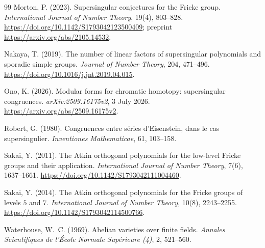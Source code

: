 \documentclass[11pt,a4paper]{article}
\numberwithin{equation}{section}
\theoremstyle{definition}
\theoremstyle{remark}
\begin{document}
\begin{thebibliography}{99}
 Morton, P. (2023). Supersingular conjectures for the
Fricke group. \emph{International Journal of Number Theory}, 19(4), 803--828.
\url{https://doi.org/10.1142/S1793042123500409}; preprint
\url{https://arxiv.org/abs/2105.14532}.

 Nakaya, T. (2019). The number of linear factors of
supersingular polynomials and sporadic simple groups. \emph{Journal of Number Theory},
204, 471--496. \url{https://doi.org/10.1016/j.jnt.2019.04.015}.


 Ono, K. (2026). Modular forms for chromatic homotopy: supersingular congruences. \emph{arXiv:2509.16175v2}, 3 July 2026. \url{https://arxiv.org/abs/2509.16175v2}.


 Robert, G. (1980). Congruences entre s\'eries d'Eisenstein, dans le cas supersingulier. \emph{Inventiones Mathematicae}, 61, 103--158.

 Sakai, Y. (2011). The Atkin orthogonal polynomials for
the low-level Fricke groups and their application.
\emph{International Journal of Number Theory}, 7(6), 1637--1661.
\url{https://doi.org/10.1142/S1793042111004460}.

 Sakai, Y. (2014). The Atkin orthogonal polynomials for
the Fricke groups of levels $5$ and $7$.
\emph{International Journal of Number Theory}, 10(8), 2243--2255.
\url{https://doi.org/10.1142/S1793042114500766}.

 Waterhouse, W.~C. (1969). Abelian varieties over finite fields. \emph{Annales Scientifiques de l'\'Ecole Normale Sup\'erieure (4)}, 2, 521--560.
\end{thebibliography}
\end{document}
